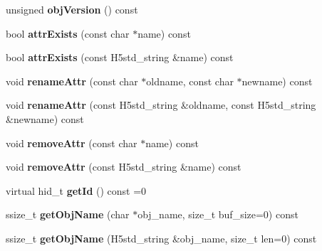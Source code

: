 \begin{DoxyCompactItemize}
\item 
\mbox{\label{class_h5_1_1_h5_object_aae0ac7d78a51f215d540f6ce5e5976a0}} 
unsigned {\bfseries obj\+Version} () const
\item 
\mbox{\label{class_h5_1_1_h5_object_a354b677eedb053dcdab090434d19e1bf}} 
bool {\bfseries attr\+Exists} (const char $\ast$name) const
\item 
\mbox{\label{class_h5_1_1_h5_object_a170d3028f081678db83132cc5434b00f}} 
bool {\bfseries attr\+Exists} (const H5std\+\_\+string \&name) const
\item 
\mbox{\label{class_h5_1_1_h5_object_a303a5fa51c03a7ed302fe88a7cd79eef}} 
void {\bfseries rename\+Attr} (const char $\ast$oldname, const char $\ast$newname) const
\item 
\mbox{\label{class_h5_1_1_h5_object_aa8e376bb5dc1c4c0e375db889b08b0e2}} 
void {\bfseries rename\+Attr} (const H5std\+\_\+string \&oldname, const H5std\+\_\+string \&newname) const
\item 
\mbox{\label{class_h5_1_1_h5_object_aad1cbcfb19f7993c981b7f2dfd8c7d2e}} 
void {\bfseries remove\+Attr} (const char $\ast$name) const
\item 
\mbox{\label{class_h5_1_1_h5_object_a17e15c351f218dc2413ee7a3e09ce877}} 
void {\bfseries remove\+Attr} (const H5std\+\_\+string \&name) const
\item 
\mbox{\label{class_h5_1_1_h5_object_a9fbbbd289647d76df6cdc74f48d39094}} 
virtual hid\+\_\+t {\bfseries get\+Id} () const =0
\item 
\mbox{\label{class_h5_1_1_h5_object_a70535cfa7cbdfff89238083b4a58ca33}} 
ssize\+\_\+t {\bfseries get\+Obj\+Name} (char $\ast$obj\+\_\+name, size\+\_\+t buf\+\_\+size=0) const
\item 
\mbox{\label{class_h5_1_1_h5_object_ad8b0a20e4c05f1cbf0123214333d8a8c}} 
ssize\+\_\+t {\bfseries get\+Obj\+Name} (H5std\+\_\+string \&obj\+\_\+name, size\+\_\+t len=0) const

\end{DoxyCompactItemize}
